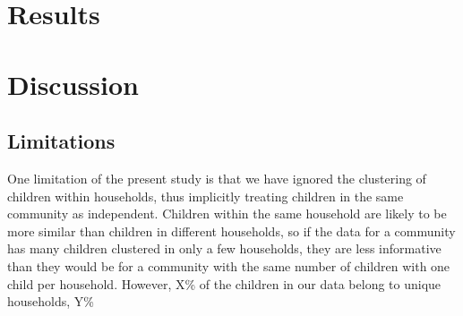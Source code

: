 \documentclass[11pt,a4paper]{article}
\begin{document}
%
%
%



\section{Results}

\section{Discussion}
\subsection{Limitations}
One limitation of the present study is that we have ignored the clustering of children within households, thus implicitly treating children in the same community as independent. Children within the same household are likely to be more similar than children in different households, so if the data for a community has many children clustered in only a few households, they are less informative than they would be for a community with the same number of children with one child per household. However, X\% of the children in our data belong to unique households, Y\% 
\end{document}
